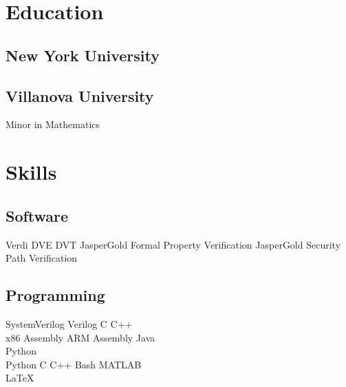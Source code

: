 \documentclass[]{detrano_resume}
\begin{document}
%
%


%
%

\begin{minipage}[t]{0.3\textwidth} 
	
	
	\section{Education} 
	
	\subsection{New York University}
	\sectionsep
	
	\subsection{Villanova University}
	Minor in Mathematics \\
	\sectionsep
	
	
	\section{Skills}
	\subsection{Software}
	Verdi \textbullet{}
	DVE \textbullet{} 
	DVT\textbullet{} 
	JasperGold Formal Property Verification 
	\textbullet{} JasperGold Security Path Verification
	\sectionsep
	
	\subsection{Programming}
	SystemVerilog \textbullet{}
	Verilog \textbullet{}
	C \textbullet{} 
	C++ \\ %
	x86 Assembly \textbullet{} 
	ARM Assembly \textbullet{}
	Java \\ %
	Python
	\\ 
	\vspace{5pt}
	Python \textbullet{}
	C \textbullet{}
	C++ \textbullet{}
	Bash \textbullet{}
	MATLAB 
	\\
	\LaTeX\
	\sectionsep
\end{minipage} 
\end{document}
